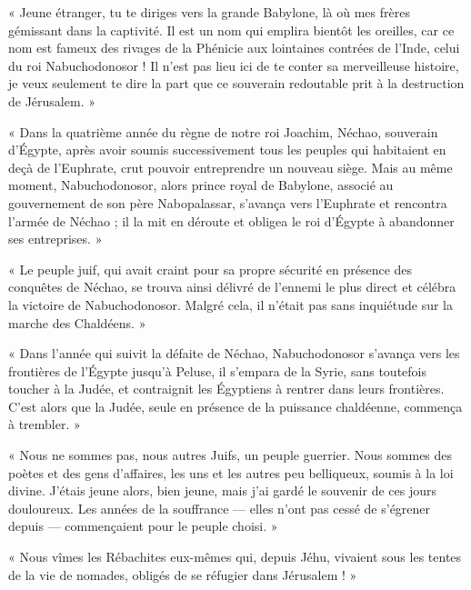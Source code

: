 \documentclass[a4paper, 11pt, oneside, polutonikogreek, french]{article}
\begin{document}
\bigskip
\centerline{\EightStarTaper}
\centerline{\EightStarTaper\EightStarTaper}
\bigskip

« Jeune étranger, tu te diriges vers la grande Babylone, là où mes frères gémissant dans la captivité. Il est un nom qui emplira bientôt les oreilles, car ce nom est fameux des rivages de la Phénicie aux lointaines contrées de l'Inde, celui du roi Nabuchodonosor ! Il n'est pas lieu ici de te conter sa merveilleuse histoire, je veux seulement te dire la part que ce souverain redoutable prit à la destruction de Jérusalem. »

\bigskip
\centerline{\EightStarTaper}
\centerline{\EightStarTaper\EightStarTaper}
\bigskip

« Dans la quatrième année du règne de notre roi Joachim, Néchao, souverain d'Égypte, après avoir soumis successivement tous les peuples qui habitaient en deçà de l'Euphrate, crut pouvoir entreprendre un nouveau siège. Mais au même moment, Nabuchodonosor, alors prince royal de Babylone, associé au gouvernement de son père Nabopalassar, s'avança vers l'Euphrate et rencontra l'armée de Néchao ; il la mit en déroute et obligea le roi d'Égypte à abandonner ses entreprises. »

« Le peuple juif, qui avait craint pour sa propre sécurité en présence des conquêtes de Néchao, se trouva ainsi délivré de l'ennemi le plus direct et célébra la victoire de Nabuchodonosor. Malgré cela, il n'était pas sans inquiétude sur la marche des Chaldéens. »

« Dans l'année qui suivit la défaite de Néchao, Nabuchodonosor s'avança vers les frontières de l'Égypte jusqu'à Peluse, il s'empara de la Syrie, sans toutefois toucher à la Judée, et contraignit les Égyptiens à rentrer dans leurs frontières. C'est alors que la Judée, seule en présence de la puissance chaldéenne, commença à trembler. »

\bigskip
\centerline{\EightStarTaper}
\centerline{\EightStarTaper\EightStarTaper}
\bigskip

« Nous ne sommes pas, nous autres Juifs, un peuple guerrier. Nous sommes des poètes et des gens d'affaires, les uns et les autres peu belliqueux, soumis à la loi divine. J'étais jeune alors, bien jeune, mais j'ai gardé le souvenir de ces jours douloureux. Les années de la souffrance --- elles n'ont pas cessé de s'égrener depuis --- commençaient pour le peuple choisi. »

« Nous vîmes les Rébachites eux-mêmes qui, depuis Jéhu, vivaient sous les tentes de la vie de nomades, obligés de se réfugier dans Jérusalem ! »
\end{document}
